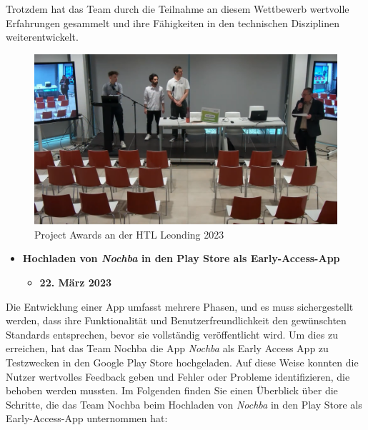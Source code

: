 Trotzdem hat das Team durch die Teilnahme an diesem Wettbewerb wertvolle Erfahrungen gesammelt und ihre Fähigkeiten in den technischen Disziplinen weiterentwickelt.

\begin{figure}[H]
    \centering
    \includegraphics[width=1\textwidth]{pics/ProjectAward.png}
    \caption{Project Awards an der HTL Leonding 2023}
    \label{fig:ProjectAward}
\end{figure}

\begin{itemize}
    \item \textbf{Hochladen von \textit{Nochba} in den Play Store als Early-Access-App}
          \begin{itemize}
              \item \textbf{22. März 2023}
          \end{itemize}
\end{itemize}

Die Entwicklung einer App umfasst mehrere Phasen, und es muss sichergestellt werden, dass ihre Funktionalität und Benutzerfreundlichkeit den gewünschten Standards entsprechen, bevor sie vollständig veröffentlicht wird. Um dies zu erreichen, hat das Team Nochba die App \textit{Nochba} als Early Access App zu Testzwecken in den Google Play Store hochgeladen. Auf diese Weise konnten die Nutzer wertvolles Feedback geben und Fehler oder Probleme identifizieren, die behoben werden mussten. Im Folgenden finden Sie einen Überblick über die Schritte, die das Team Nochba beim Hochladen von \textit{Nochba} in den Play Store als Early-Access-App unternommen hat:

